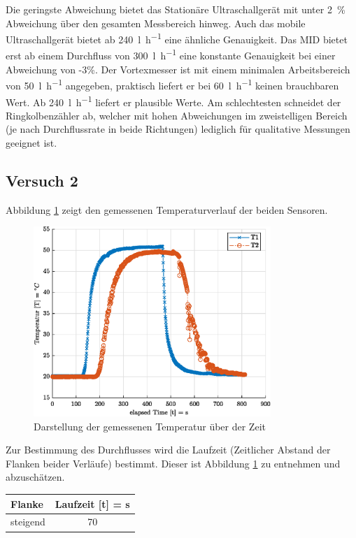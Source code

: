 Die geringste Abweichung bietet das Stationäre Ultraschallgerät mit unter \SI{2}{\percent} Abweichung über den gesamten Messbereich hinweg. Auch das mobile Ultraschallgerät bietet ab \SI{240}{\litre\per\hour} eine ähnliche Genauigkeit. Das MID bietet erst ab einem Durchfluss von \SI{300}{\litre\per\hour} eine konstante Genauigkeit bei einer Abweichung von -3\%. Der Vortexmesser ist mit einem minimalen Arbeitsbereich von \SI{50}{\litre\per\hour} angegeben, praktisch liefert er bei \SI{60}{\litre\per\hour} keinen brauchbaren Wert. Ab \SI{240}{\litre\per\hour} liefert er plausible Werte. Am schlechtesten schneidet der Ringkolbenzähler ab, welcher mit hohen Abweichungen im zweistelligen Bereich (je nach Durchflussrate in beide Richtungen) lediglich für qualitative Messungen geeignet ist.

\subsection{Versuch 2}


Abbildung \ref{fig:temp} zeigt den gemessenen Temperaturverlauf der beiden Sensoren.

\begin{figure}[H]
	\centering
	\includegraphics[width=0.8\textwidth]{../DATA/tempPlot.eps}
	\caption{Darstellung der gemessenen Temperatur über der Zeit}
	\label{fig:temp}
\end{figure}

Zur Bestimmung des Durchflusses wird  die Laufzeit (Zeitlicher Abstand der Flanken beider Verläufe) bestimmt. Dieser ist Abbildung \ref{fig:temp} zu entnehmen und abzuschätzen.

\begin{center}
	\begin{tabular}{l|c}
		\label{tab:}
		
		\textbf{Flanke} & \textbf{Laufzeit} [t] = s\\
		\hline
		steigend & 70 
	\end{tabular}
\end{center}


